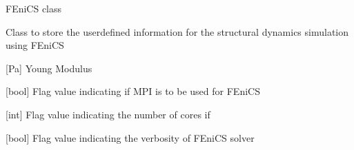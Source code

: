 \documentclass[letterpaper,10pt,english]{sphinxmanual}
\begin{document}
\begin{fulllineitems}
\label{\detokenize{modules:configuration.Fenics}}
\pysigstartsignatures
{}
\pysigstopsignatures
\sphinxAtStartPar
FEniCS class

\sphinxAtStartPar
Class to store the user\sphinxhyphen{}defined information for the structural dynamics simulation using FEniCS

\begin{fulllineitems}
\label{\detokenize{modules:configuration.Fenics.E}}
\pysigstartsignatures
{}
\pysigstopsignatures
\sphinxAtStartPar
{[}Pa{]} Young Modulus

\end{fulllineitems}


\begin{fulllineitems}
\label{\detokenize{modules:configuration.Fenics.FE_MPI}}
\pysigstartsignatures
{}
\pysigstopsignatures
\sphinxAtStartPar
{[}bool{]} Flag value indicating if MPI is to be used for FEniCS

\end{fulllineitems}


\begin{fulllineitems}
\label{\detokenize{modules:configuration.Fenics.FE_MPI_cores}}
\pysigstartsignatures
{}
\pysigstopsignatures
\sphinxAtStartPar
{[}int{]} Flag value indicating the number of cores if 

\end{fulllineitems}


\begin{fulllineitems}
\label{\detokenize{modules:configuration.Fenics.FE_verbose}}
\pysigstartsignatures
{}
\pysigstopsignatures
\sphinxAtStartPar
{[}bool{]} Flag value indicating the verbosity of FEniCS solver

\end{fulllineitems}


\end{fulllineitems}
\end{document}
